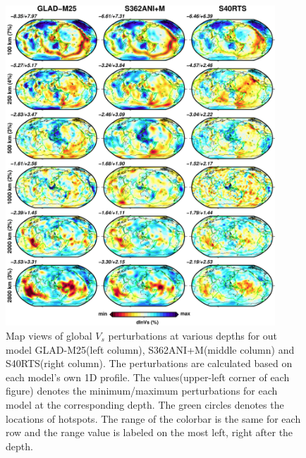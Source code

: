 \documentclass[extra,mreferee]{gji}
\begin{document}
\begin{figure}
\includegraphics[width=0.9\textwidth]{figures/depth_slice/globe_vs.pdf}
  \caption{Map views of global $V_s$ perturbations at various depths for out model GLAD-M25(left column), S362ANI+M(middle column)\citep{moulik2014anisotropic} and S40RTS(right column)\citep{ritsema2011s40rts}. The perturbations are calculated based on each model's own 1D profile. The values(upper-left corner of each figure) denotes the minimum/maximum perturbations for each model at the corresponding depth. The green circles denotes the locations of hotspots\citep{montelli2006catalogue}. The range of the colorbar is the same for each row and the range value is labeled on the most left, right after the depth.}
\label{fig:global-vs}
\centering
\end{figure}
\end{document}
